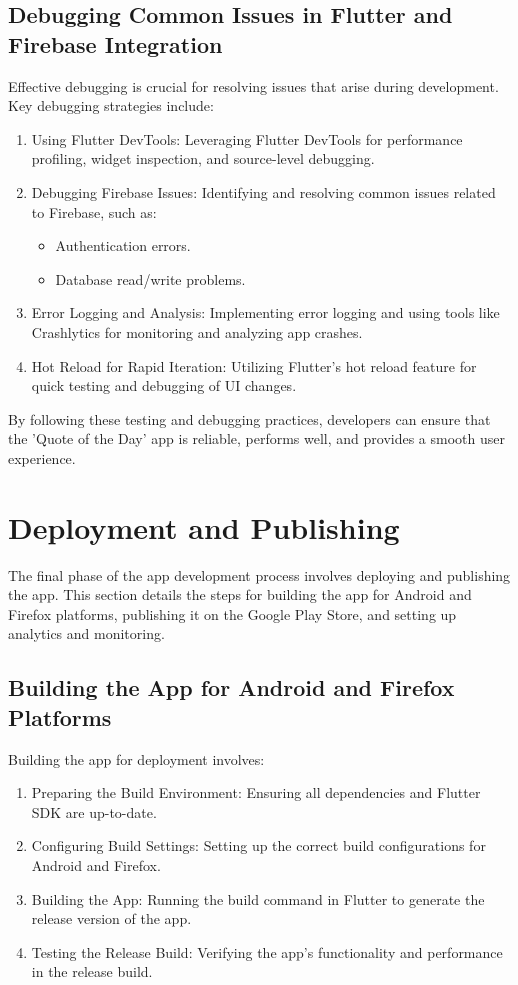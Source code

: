 \documentclass{book}
\begin{document}
\subsection{Debugging Common Issues in Flutter and Firebase Integration}
Effective debugging is crucial for resolving issues that arise during development. Key debugging strategies include:

\begin{enumerate}
    \item Using Flutter DevTools: Leveraging Flutter DevTools for performance profiling, widget inspection, and source-level debugging.
    \item Debugging Firebase Issues: Identifying and resolving common issues related to Firebase, such as:
    \begin{itemize}
        \item Authentication errors.
        \item Database read/write problems.
    \end{itemize}
    \item Error Logging and Analysis: Implementing error logging and using tools like Crashlytics for monitoring and analyzing app crashes.
    \item Hot Reload for Rapid Iteration: Utilizing Flutter's hot reload feature for quick testing and debugging of UI changes.
\end{enumerate}

By following these testing and debugging practices, developers can ensure that the 'Quote of the Day' app is reliable, performs well, and provides a smooth user experience.

\section{Deployment and Publishing}
The final phase of the app development process involves deploying and publishing the app. This section details the steps for building the app for Android and Firefox platforms, publishing it on the Google Play Store, and setting up analytics and monitoring.

\subsection{Building the App for Android and Firefox Platforms}
Building the app for deployment involves:
\begin{enumerate}
    \item Preparing the Build Environment: Ensuring all dependencies and Flutter SDK are up-to-date.
    \item Configuring Build Settings: Setting up the correct build configurations for Android and Firefox.
    \item Building the App: Running the build command in Flutter to generate the release version of the app.
    \item Testing the Release Build: Verifying the app's functionality and performance in the release build.
\end{enumerate}
\end{document}
